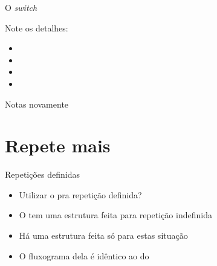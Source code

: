 \documentclass[14pt]{beamer}
\begin{document}
		\begin{frame}{O \textit{switch}}
			\begin{multicols}{2}
				
			\end{multicols}
			Note os detalhes:
			\begin{multicols}{2}
				\begin{itemize}
					\presentationPause\item {}
					\presentationPause\item {}
					\presentationPause\item {}
					\presentationPause\item {}
				\end{itemize}
			\end{multicols}
		\end{frame}


		\begin{frame}{Notas novamente}
			
		\end{frame}	

	\section{Repete mais}
		\begin{frame}{Repetições definidas}
			\begin{itemize}
				\presentationPause\item Utilizar o  pra repetição definida?
				\presentationPause\item O  tem uma estrutura feita para repetição indefinida
				\presentationPause\item Há uma estrutura feita só para estas situação
				\presentationPause\item O fluxograma dela é idêntico ao do 
			\end{itemize}
			\presentationPause
		\end{frame}
\end{document}
